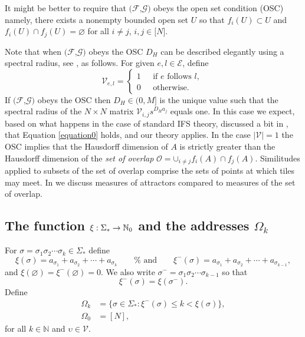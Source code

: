 \documentclass{amsproc}
\theoremstyle{plain}
\theoremstyle{definition}
\numberwithin{equation}{section}
\begin{document}
It might be better to require that $(\mathcal{F}$,$\mathcal{G)}$ obeys the
open set condition (OSC) namely, there exists a nonempty bounded open set $U$
so that $f_{i}(U)\subset U$ and $f_{i}(U)\cap f_{j}(U)=\varnothing$ for all $%
i\neq j$, $i,j\in\lbrack N]$.

Note that when $(\mathcal{F}$,$\mathcal{G)}$ obeys the OSC $D_{H}$ can be
described elegantly using a spectral radius, see \cite{mauldin}, as follows.
For given $e,l\in\mathcal{E}$, define%
\begin{equation*}
\mathcal{V}_{e,l}=\left\{ 
\begin{array}{cc}
1\text{ } & \text{if }e\text{ follows }l\text{, } \\ 
0\text{ } & \text{otherwise.}%
\end{array}
\right.
\end{equation*}
If $(\mathcal{F}$,$\mathcal{G)}$ obeys the OSC then $D_{H}\in(0,M]$ is the
unique value such that the spectral radius of the $N\times N$ matrix $%
\mathcal{V}_{i,j}s^{D_{H}a_{j}}$ equals one. In this case we expect, based
on what happens in the case of standard IFS theory, discussed a bit in \cite%
{barnsleyvince}, that Equation \ref{equation0} holds, and our theory
applies. In the case $\left\vert \mathcal{V}\right\vert =1$ the OSC implies
that the Hausdorff dimension of $A$ is strictly greater than the Hausdorff
dimension of the \textit{set of overlap} $\mathcal{O=\cup}_{i\neq
j}f_{i}(A)\cap f_{j}(A)$. Similitudes applied to subsets of the set of
overlap comprise the sets of points at which tiles may meet. In \cite[p.481]%
{bandt} we discuss measures of attractors compared to measures of the set of
overlap.

\subsection{The function $\protect\xi:\Sigma_{\ast}\rightarrow\mathbb{N}_{0}$
and the addresses $\Omega_{k}$}

For $\sigma=\sigma_{1}\sigma_{2}\cdots\sigma_{k}\in\Sigma_{\ast}$ define 
\begin{equation*}
\xi(\sigma)=a_{\sigma_{1}}+a_{\sigma_{2}}+\cdots+a_{\sigma_{k}}\qquad \text{%
and}\qquad\xi^{-}(\sigma)=a_{\sigma_{1}}+a_{\sigma_{2}}+\cdots
+a_{\sigma_{k-1}},
\end{equation*}
and $\xi(\varnothing)=\xi^{-}(\varnothing)=0$. We also write $\sigma
^{-}=\sigma_{1}\sigma_{2}\cdots\sigma_{k-1}$ so that 
\begin{equation*}
\xi^{-}(\sigma)=\xi(\sigma^{-}).
\end{equation*}
Define 
\begin{align*}
\Omega_{k} & =\{\sigma\in\Sigma_{\ast}:\xi^{-}(\sigma)\leq k<\xi (\sigma)\},
\\
\Omega_{0} & =\left[ N\right] ,
\end{align*}
for all $k\in\mathbb{N}$ and $\upsilon\in\mathcal{V}$.
\end{document}
